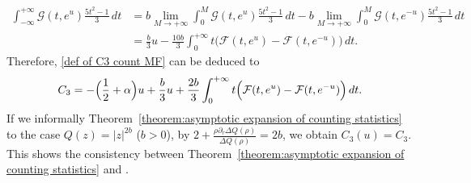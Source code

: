 \documentclass[reqno]{amsart}
\newcommand{\1}{\mathds{1}}
\numberwithin{equation}{section}
\theoremstyle{definition}
\begin{document}
\begin{align*}
\int_{-\infty}^{+\infty}\mathcal{G}(t,e^u)\frac{5t^2-1}{3}\,dt
&=
b\lim_{M\to+\infty}\int_0^{M}\mathcal{G}(t,e^u)\frac{5t^2-1}{3}\,dt
-
b\lim_{M\to+\infty}\int_0^{M}\mathcal{G}(t,e^{-u})\frac{5t^2-1}{3}\,dt
\\
&=\frac{b}{3}u-\frac{10b}{3}\int_0^{+\infty}t\bigl( \mathcal{F}(t,e^{u})-\mathcal{F}(t,e^{-u})\bigr)\,dt. 
\end{align*}
Therefore, \eqref{def of C3 count MF} can be deduced to 
\[
C_3=-\Bigl(\frac{1}{2}+\alpha\Bigr)u+\frac{b}{3}u+\frac{2b}{3}\int_0^{+\infty}t\Bigl(\mathcal{F}(t,e^{u})-\mathcal{F}(t,e^{-u})\Bigr)\,dt. 
\]
If we informally Theorem~\ref{theorem:asymptotic expansion of counting statistics} to the case $Q(z)=|z|^{2b}$ ($b>0$), by $2+\frac{\rho\partial_r\Delta Q(\rho)}{\Delta Q(\rho)}=2b$, we obtain $C_3(u)=C_3$.
This shows the consistency between Theorem~\ref{theorem:asymptotic expansion of counting statistics} and \cite[Theorem~1.1]{C2021 FH}.
\end{document}
